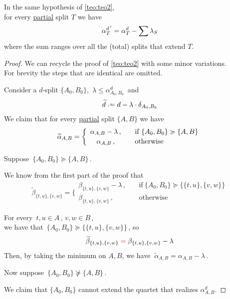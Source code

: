 \documentclass[./main.tex]{subfiles}
\begin{document}
\begin{proposition} \label{prop:teo2ext}
    In the same hypothesis of \autoref{teo:teo2}, \\ for every \underline{partial} split $T$ we have
    \[ \alpha_T^{d^{\,\prime}} = \alpha_T^d - \sum \lambda_S \]
    where the sum ranges over all the (total) splits that extend $T$.
\end{proposition}
\begin{proof}
    We can recycle the proof of \autoref{teo:teo2} with some minor variations. \\
    For brevity the steps that are identical are omitted. \bigskip

    Consider a $d$-split $\{A_0,B_0\}$, $\, \lambda \leq \alpha_{A_0,B_0}^d \,$ and
    \[ \widetilde{d} \defeq d - \lambda \cdot \delta_{A_0,B_0} \]
    We claim that for every \underline{partial} split $\{A,B\}$ we have
    \[ \widetilde{\alpha}_{A,B} = \bigg\{
        \begin{array}{cl}
            \alpha_{A,B} - \lambda \,,   & \quad \text{if}\ \{A_0,B_0\} \succcurlyeq \{A,B\} \\[2pt]
            \alpha_{A,B} \,,             & \quad \text{otherwise}
        \end{array}
    \nospblw \] \bigskip

    Suppose $\, \{A_0,B_0\} \succcurlyeq \{A,B\} \,$.

    We know from the first part of the proof that
    \[ \widetilde{\beta}_{\{t,u\},\{v,w\}} = \bigg\{
        \begin{array}{cl}
            \beta_{\{t,u\},\{v,w\}} - \lambda \,,   & \quad \text{if}\ \{A_0,B_0\} \succcurlyeq \bigl\{ \{t,u\},\{v,w\} \bigr\} \\[2pt]
            \beta_{\{t,u\},\{v,w\}} \,,             & \quad \text{otherwise}
        \end{array}
    \]
    
    For every $\, t,u \in A \,,\, v,w \in B \,$, \\[2pt]
    we have that $\, \{A_0,B_0\} \succcurlyeq \bigl\{ \{t,u\},\{v,w\} \bigr\} \,$, so
    \[ \widetilde{\beta}_{\{t,u\},\{v,w\}} \mathcolor{red}{=} \beta_{\{t,u\},\{v,w\}} - \lambda \]
    Then, by taking the minimum on $A,B$, we have $\ \widetilde{\alpha}_{A,B} = \alpha_{A,B} - \lambda \,$. \bigskip \medskip

    Now suppose $\, \{A_0,B_0\} \not\succcurlyeq \{A,B\} \,$.

    We claim that $\{A_0,B_0\}$ cannot extend the quartet that realizes $\alpha_{A,B}^d$. \medskip


\end{proof}
\end{document}
